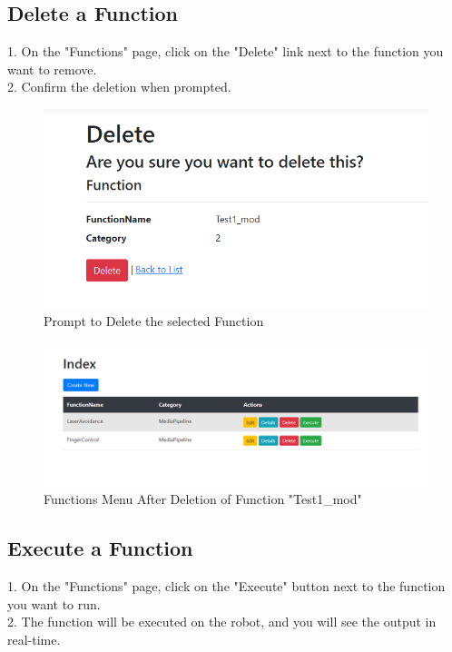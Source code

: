 \documentclass[12pt,a4paper]{scrbook}
\begin{document}
	\subsection{Delete a Function}
	1. On the "Functions" page, click on the "Delete" link next to the function you want to remove.\\
	2. Confirm the deletion when prompted.\\
	\begin{figure}[H]
		\centering
		\includegraphics[width=\linewidth]{Images/delete.png}
		\caption{Prompt to Delete the selected Function}
		\label{}
	\end{figure}
	\begin{figure}[H]
		\centering
		\includegraphics[width=\linewidth]{Images/afterdelete.png}
		\caption{Functions Menu After Deletion of Function "Test1\_mod"}
		\label{}
	\end{figure}
	\subsection{Execute a Function}
	1. On the "Functions" page, click on the "Execute" button next to the function you want to run.\\
	2. The function will be executed on the robot, and you will see the output in real-time.\\
	
\end{document}
